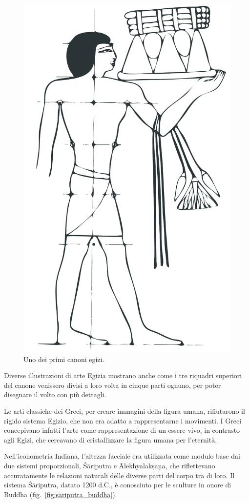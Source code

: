 \begin{figure}[h!]
\centering
\includegraphics[width=.35\textwidth]{./images/egizi_canone_piede.pdf}
\caption{Uno dei primi canoni egizi.}
\label{fig:egyptian_canon}
\end{figure}

Diverse illustrazioni di arte Egizia mostrano anche come i tre riquadri superiori del canone venissero divisi a loro volta in cinque parti ognuno, per poter disegnare il volto con più dettagli.

Le arti classiche dei Greci, per creare immagini della figura umana, rifiutarono il rigido sistema Egizio, che non era adatto a rappresentarne i movimenti. I Greci concepivano infatti l'arte come rappresentazione di un essere vivo, in contrasto agli Egizi, che cercavano di cristallizzare la figura umana per l'eternità.

Nell'iconometria Indiana, l'altezza facciale era utilizzata come modulo base dai due sistemi proporzionali, Śāriputra e Ālekhyalakṣaṇa, che riflettevano accuratamente le relazioni naturali delle diverse parti del corpo tra di loro. Il sistema Śāriputra, datato 1200 d.C., è conosciuto per le sculture in onore di Buddha (fig.~\vref{fig:sariputra_buddha}).

